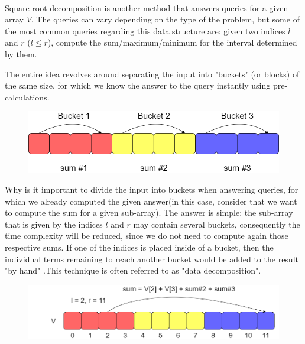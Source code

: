 \documentclass[letterpaper]{article}
\begin{document}
\paragraph{}

Square root decomposition is another method that answers queries for a given array $V$. The queries can vary depending on the type of the problem, but some of the most common queries regarding this data structure are: given two indices $l$ and $r$ ($l \leq r$), compute the sum/maximum/minimum for the interval determined by them. 

The entire idea revolves around separating the input into "buckets" (or blocks) of the same size, for which we know the answer to the query instantly using pre-calculations.

\begin{figure} [h!]
\centering
\includegraphics[width=1\textwidth]{pngOfDiagrams/sqrtdecomposition.png}
\end{figure}

Why is it important to divide the input into buckets when answering queries, for which we already computed the given answer(in this case, consider that we want to compute the sum for a given sub-array). The answer is simple: the sub-array that is given by the indices $l$ and $r$ may contain several buckets, consequently the time complexity will be reduced, since we do not need to compute again those respective sums. If one of the indices is placed inside of a bucket, then the individual terms remaining to reach another bucket would be added to the result "by hand" .This technique is often referred to as "data decomposition". 

\begin{figure} [h!]
\centering
\includegraphics[width=1\textwidth]{pngOfDiagrams/sqrtdecomposition2.png}
\end{figure}
\end{document}
